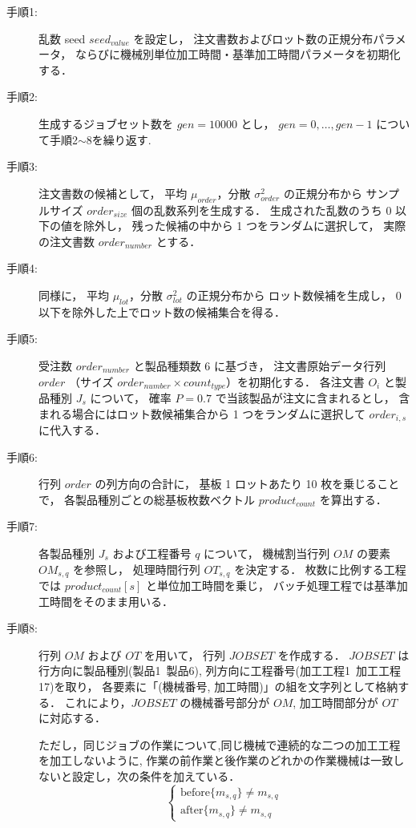 \documentclass{jarticle}
\begin{document}
\begin{description}
  \item[手順1:] 乱数 seed $seed_{value}$ を設定し，
  注文書数およびロット数の正規分布パラメータ，
  ならびに機械別単位加工時間・基準加工時間パラメータを初期化する．

  \item[手順2:] 生成するジョブセット数を $gen=10000$ とし，
  $gen=0,\ldots,gen-1$ について手順2$\sim$8を繰り返す.

  \item[手順3:] 注文書数の候補として，
  平均 $\mu_{order}$，分散 $\sigma^2_{order}$ の正規分布から
  サンプルサイズ $order_{size}$ 個の乱数系列を生成する．
  生成された乱数のうち $0$ 以下の値を除外し，
  残った候補の中から 1 つをランダムに選択して，
  実際の注文書数 $order_{number}$ とする．

  \item[手順4:] 同様に，
  平均 $\mu_{lot}$，分散 $\sigma^2_{lot}$ の正規分布から
  ロット数候補を生成し，
  $0$ 以下を除外した上でロット数の候補集合を得る．

  \item[手順5:] 受注数 $order_{number}$ と製品種類数 $6$ に基づき，
  注文書原始データ行列 $order$
  （サイズ $order_{number} \times count_{type}$）を初期化する．
  各注文書 $O_i$ と製品種別 $J_s$ について，
  確率 $P=0.7$ で当該製品が注文に含まれるとし，
  含まれる場合にはロット数候補集合から 1 つをランダムに選択して
  $order_{i,s}$ に代入する．

  \item[手順6:] 行列 $order$ の列方向の合計に，
  基板 1 ロットあたり 10 枚を乗じることで，
  各製品種別ごとの総基板枚数ベクトル
  $product_{count}$ を算出する．

  \item[手順7:] 各製品種別 $J_s$ および工程番号 $q$ について，
  機械割当行列 $OM$ の要素 $OM_{s,q}$ を参照し，
  処理時間行列 $OT_{s,q}$ を決定する．
  枚数に比例する工程では
  $product_{count}[s]$ と単位加工時間を乗じ，
  バッチ処理工程では基準加工時間をそのまま用いる．

  \item[手順8:] 行列 $OM$ および $OT$ を用いて，
  行列 $JOBSET$ を作成する．
  $JOBSET$ は行方向に製品種別(製品1~製品6),
  列方向に工程番号(加工工程1~加工工程17)を取り，
  各要素に「(機械番号, 加工時間)」の組を文字列として格納する．
  これにより，$JOBSET$ の機械番号部分が $OM$,
  加工時間部分が $OT$ に対応する．

  ただし，同じジョブの作業について,同じ機械で連続的な二つの加工工程を加工しないように,
  作業の前作業と後作業のどれかの作業機械は一致しないと設定し，次の条件を加えている．
  \begin{equation}
  \begin{cases}
  \mathrm{before}\{m_{s,q}\} \neq m_{s,q} \\
  \mathrm{after}\{m_{s,q}\} \neq m_{s,q}
  \end{cases}
  \label{eq:machine_exclusion}
  \end{equation}


\end{description}
\end{document}
